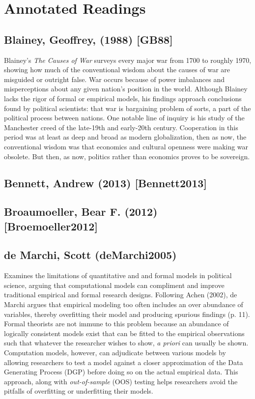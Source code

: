 \documentclass[11pt]{article}
\begin{document}
\section{Annotated Readings}
\label{sec-5}
\subsection{Blainey, Geoffrey, (1988) [GB88]}
\label{sec-5-1}
Blainey's \emph{The Causes of War} surveys every major war from 1700 to
roughly 1970, showing how much of the conventional wisdom about the
causes of war are misguided or outright false. War occurs because of
power imbalances and misperceptions about any given nation's position
in the world. Although Blainey lacks the rigor of formal or empirical
models, his findings approach conclusions found by political
scientists: that war is bargaining problem of sorts, a part of the
political process between nations. One notable line of inquiry is his
study of the Manchester creed of the late-19th and early-20th
century. Cooperation in this period was at least as deep and broad as
modern globalization, then as now, the conventional wisdom was that
economics and cultural openness were making war obsolete. But then, as
now, politics rather than economics proves to be sovereign.  
\subsection{Bennett, Andrew (2013) [Bennett2013]}
\label{sec-5-2}
\subsection{Broaumoeller, Bear F. (2012) [Broemoeller2012]}
\label{sec-5-3}
\subsection{de Marchi, Scott (deMarchi2005)}
\label{sec-5-4}
Examines the limitations of quantitative and and formal models in
political science, arguing that computational models can compliment
and improve traditional empirical and formal research designs.
Following Achen (2002), de Marchi argues that empirical modeling too
often includes an over abundance of variables, thereby overfitting
their model and producing spurious findings (p. 11). Formal theorists
are not immune to this problem because an abundance of logically
consistent models exist that can be fitted to the empirical
observations such that whatever the researcher wishes to show, \emph{a
priori} can usually be shown. Computation models, however, can
adjudicate between various models by allowing researchers to test a
model against a closer approximation of the Data Generating Process
(DGP) before doing so on the actual empirical data. This approach,
along with \emph{out-of-sample} (OOS) testing helps researchers avoid the
pitfalls of overfitting or underfitting their models.   
\end{document}
